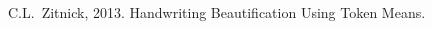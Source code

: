 \documentclass[journal]{IEEEtran}
\begin{document}

%
%
%
\begin{thebibliography}{1}

C.L.~Zitnick, 2013. Handwriting Beautification Using Token Means.

\end{thebibliography}
\end{document}
